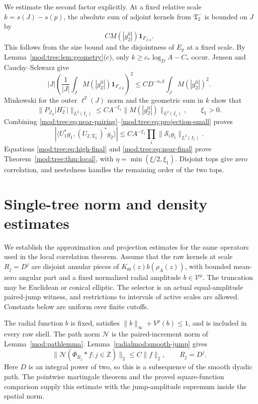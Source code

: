 \documentclass[11pt]{article}
\numberwithin{equation}{section}
\theoremstyle{remark}
\theoremstyle{definition}
\newcommand{\norm}[1]{\lVert #1\rVert}
\newcommand{\NN}{\mathcal N}
\newcommand{\TT}{\mathfrak T}
\newcommand{\cJ}{\mathcal J}
\begin{document}
We estimate the second factor explicitly. At a fixed relative scale $k=s(J)-s(p)$, the absolute sum of adjoint kernels from $\TT_2^-$ is bounded on $J$ by
\[
 CM(|g_2^0|)\mathbf1_{F_{J,k}}.
\]
This follows from the size bound and the disjointness of $E_p$ at a fixed scale. By Lemma~\ref{mod:tree:lem:geometry}(c), only $k\ge c_*\log_D A-C_*$ occur. Jensen and Cauchy--Schwarz give
\[
 |J|\left(\frac1{|J|}\int_J M(|g_2^0|)\mathbf1_{F_{J,k}}\right)^2
 \le CD^{-\kappa_*k}\int_JM(|g_2^0|)^2.
\]
Minkowski for the outer $\ell^2(J)$ norm and the geometric sum in $k$ show that
\begin{equation}\label{mod:tree:eq:projection-small}
 \norm{P_{\cJ_0}|H_2^-|}_{L^2(I_1)}
 \le CA^{-\xi_1}\norm{M(|g_2^0|)}_{L^2(I_1)},\qquad \xi_1>0.
\end{equation}
Combining \eqref{mod:tree:eq:near-pairing}--\eqref{mod:tree:eq:projection-small} proves
\begin{equation}\label{mod:tree:eq:near-final}
 |\langle U_1^*g_1,(U_{2,\TT_2^-})^*g_2\rangle|
 \le CA^{-\xi_1}\prod_i\norm{\mathscr S_ig_i}_{L^2(I_1)}.
\end{equation}
Equations \eqref{mod:tree:eq:high-final} and \eqref{mod:tree:eq:near-final} prove Theorem~\ref{mod:tree:thm:local}, with $\eta=\min(\xi/2,\xi_1)$. Disjoint tops give zero correlation, and nestedness handles the remaining order of the two tops.

\section{Single-tree norm and density estimates}\label{mod:tree:sec:tree-inputs}
We establish the approximation and projection estimates for the same operators used in the local correlation theorem. Assume that the raw kernels at scale $R_j=D^j$ are disjoint annular pieces of $K_\Theta(z)b(\rho_A(z))$, with bounded mean-zero angular part and a fixed normalized radial amplitude $b\in\mathcal V^\rho$. The truncation may be Euclidean or conical elliptic. The selector is an actual equal-amplitude paired-jump witness, and restrictions to intervals of active scales are allowed. Constants below are uniform over finite cutoffs.


The radial function $b$ is fixed, satisfies
$\|b\|_\infty+V^\rho(b)\le1$, and is included in every raw shell.
The path norm $\NN$ is the paired-increment norm of
Lemma~\ref{mod:pathlemma}. Lemma~\ref{radialmod:smooth-jump} gives
\begin{equation}\label{mod:tree:eq:smooth-jump-input}
 \|\NN(\Phi_{R_j}*f:j\in\mathbb Z)\|_2\le C\|f\|_2,
 \qquad R_j=D^j.
\end{equation}
Here $D$ is an integral power of two, so this is a subsequence of the
smooth dyadic path. The pointwise martingale theorem and the proved
square-function comparison supply this estimate with the jump-amplitude
supremum inside the spatial norm.
\end{document}
